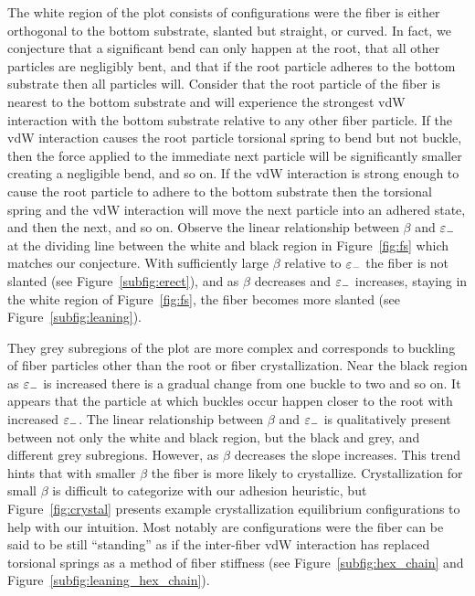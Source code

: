 The white region of the plot consists of configurations were the fiber is either orthogonal to the bottom substrate, slanted but straight, or curved. In fact, we conjecture that a significant bend can only happen at the root, that all other particles are negligibly bent, and that if the root particle adheres to the bottom substrate then all particles will. Consider that the root particle of the fiber is nearest to the bottom substrate and will experience the strongest vdW interaction with the bottom substrate relative to any other fiber particle. If the vdW interaction causes the root particle torsional spring to bend but not buckle, then the force applied to the immediate next particle will be significantly smaller creating a negligible bend, and so on. If the vdW interaction is strong enough to cause the root particle to adhere to the bottom substrate then the torsional spring and the vdW interaction will move the next particle into an adhered state, and then the next, and so on. Observe the linear relationship between $\beta$ and $\varepsilon_-$ at the dividing line between the white and black region in Figure~\ref{fig:fs} which matches our conjecture. With sufficiently large $\beta$ relative to $\varepsilon_-$ the fiber is not slanted (see Figure~\ref{subfig:erect}), and as $\beta$ decreases and $\varepsilon_-$ increases, staying in the white region of Figure~\ref{fig:fs}, the fiber becomes more slanted (see Figure~\ref{subfig:leaning}).

They grey subregions of the plot are more complex and corresponds to buckling of fiber particles other than the root or fiber crystallization. Near the black region as $\varepsilon_-$ is increased there is a gradual change from one buckle to two and so on. It appears that the particle at which buckles occur happen closer to the root with increased $\varepsilon_-$. The linear relationship between $\beta$ and $\varepsilon_-$ is qualitatively present between not only the white and black region, but the black and grey, and different grey subregions. However, as $\beta$ decreases the slope increases. This trend hints that with smaller $\beta$ the fiber is more likely to crystallize. Crystallization for small $\beta$ is difficult to categorize with our adhesion heuristic, but Figure~\ref{fig:crystal} presents example crystallization equilibrium configurations to help with our intuition. Most notably are configurations were the fiber can be said to be still ``standing'' as if the inter-fiber vdW interaction has replaced torsional springs as a method of fiber stiffness (see Figure~\ref{subfig:hex_chain} and Figure~\ref{subfig:leaning_hex_chain}).

